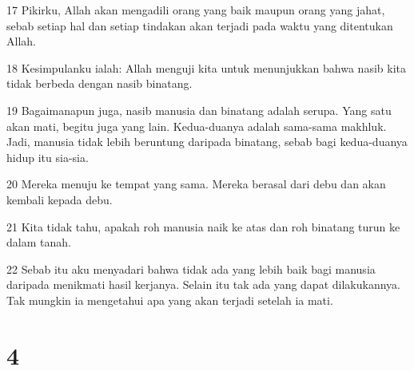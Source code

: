 \par 17 Pikirku, Allah akan mengadili orang yang baik maupun orang yang jahat, sebab setiap hal dan setiap tindakan akan terjadi pada waktu yang ditentukan Allah.
\par 18 Kesimpulanku ialah: Allah menguji kita untuk menunjukkan bahwa nasib kita tidak berbeda dengan nasib binatang.
\par 19 Bagaimanapun juga, nasib manusia dan binatang adalah serupa. Yang satu akan mati, begitu juga yang lain. Kedua-duanya adalah sama-sama makhluk. Jadi, manusia tidak lebih beruntung daripada binatang, sebab bagi kedua-duanya hidup itu sia-sia.
\par 20 Mereka menuju ke tempat yang sama. Mereka berasal dari debu dan akan kembali kepada debu.
\par 21 Kita tidak tahu, apakah roh manusia naik ke atas dan roh binatang turun ke dalam tanah.
\par 22 Sebab itu aku menyadari bahwa tidak ada yang lebih baik bagi manusia daripada menikmati hasil kerjanya. Selain itu tak ada yang dapat dilakukannya. Tak mungkin ia mengetahui apa yang akan terjadi setelah ia mati.

\chapter{4}


